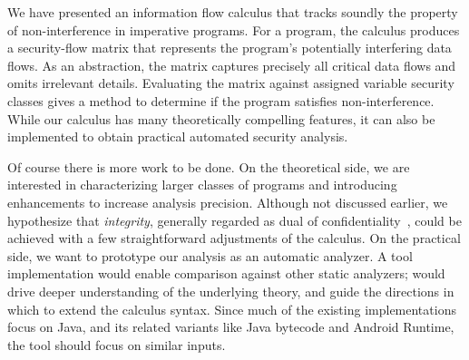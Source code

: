 We have presented an information flow calculus that tracks soundly the property of non-interference in imperative programs.
For a program, the calculus produces a security-flow matrix that represents the program's potentially interfering data flows.
As an abstraction, the matrix captures precisely all critical data flows and omits irrelevant details.
Evaluating the matrix against assigned variable security classes gives a method to determine if the program satisfies non-interference.
While our calculus has many theoretically compelling features, it can also be implemented to obtain practical automated security analysis.

Of course there is more work to be done.
On the theoretical side, we are interested in characterizing larger classes of programs and introducing enhancements to increase analysis precision.
Although not discussed earlier, we hypothesize that \emph{integrity}, generally regarded as dual of confidentiality~\cite{biba1977}, could be achieved
with a few straightforward adjustments of the calculus.
On the practical side, we want to prototype our analysis as an automatic analyzer.
A tool implementation would enable comparison against other static analyzers; would drive deeper understanding of the underlying theory, and guide the directions in which to extend the calculus syntax.
Since much of the existing implementations focus on Java, and its related variants like Java bytecode and Android Runtime, the tool should focus on similar inputs.

